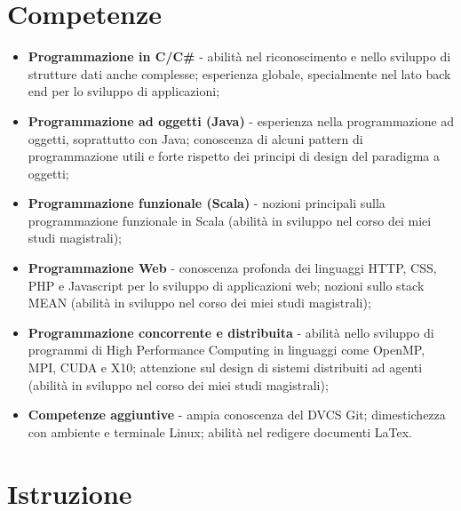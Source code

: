\documentclass[letterpaper]{twentysecondcv} %
\begin{document}
\section{Competenze}
\begin{itemize}
    \item \textbf{Programmazione in C/C\#} - abilità nel riconoscimento e nello sviluppo di strutture dati anche complesse; esperienza globale, specialmente nel lato back end per lo sviluppo di applicazioni;
    \item \textbf{Programmazione ad oggetti (Java)} - esperienza nella programmazione ad oggetti, soprattutto con Java; conoscenza di alcuni pattern di programmazione utili e forte rispetto dei principi di design del paradigma a oggetti;
    \item \textbf{Programmazione funzionale (Scala)} - nozioni principali sulla programmazione funzionale in Scala (abilità in sviluppo nel corso dei miei studi magistrali);
    \item \textbf{Programmazione Web} - conoscenza profonda dei linguaggi HTTP, CSS, PHP e Javascript per lo sviluppo di applicazioni web; nozioni sullo stack MEAN (abilità in sviluppo nel corso dei miei studi magistrali);
    \item \textbf{Programmazione concorrente e distribuita} - abilità nello sviluppo di programmi di High Performance Computing in linguaggi come OpenMP, MPI, CUDA e X10; attenzione sul design di sistemi distribuiti ad agenti (abilità in sviluppo nel corso dei miei studi magistrali);
     \item \textbf{Competenze aggiuntive} - ampia conoscenza del DVCS Git; dimestichezza con ambiente e terminale Linux; abilità nel redigere documenti LaTex.
\end{itemize}

\section{Istruzione}
\end{document}
